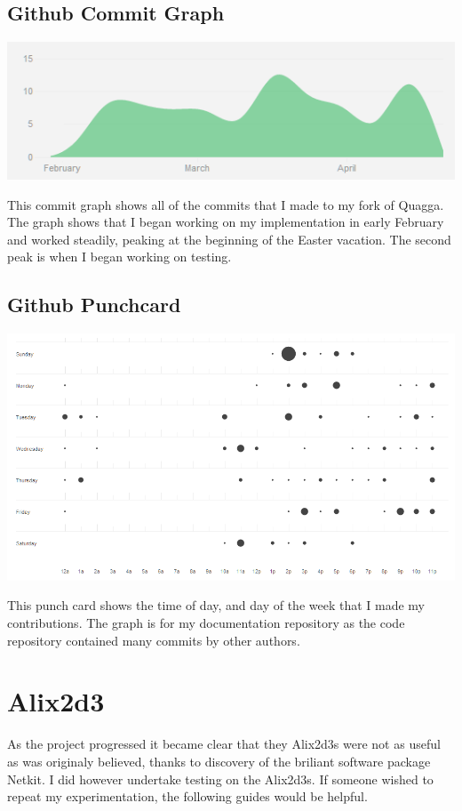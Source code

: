 \section{Github Commit Graph}
\begin{center}
	\includegraphics[width=\linewidth]{../Diagrams/Stats/GitHubCommitGraph.png}
\end{center}

This commit graph shows all of the commits that I made to my fork of Quagga.
The graph shows that I began working on my implementation in early February and
worked steadily, peaking at the beginning of the Easter vacation. The second
peak is when I began working on testing.

\section{Github Punchcard}
\begin{center}
	\includegraphics[width=\linewidth]{../Diagrams/Stats/GitHubPunchCard.png}
\end{center}

This punch card shows the time of day, and day of the week that I made 
my contributions. The graph is for my documentation repository as the code
repository contained many commits by other authors.

\chapter{Alix2d3}
As the project progressed it became clear that they Alix2d3s were not as useful
as was originaly believed, thanks to discovery of the briliant software package
Netkit. I did however undertake testing on the Alix2d3s. If someone wished to
repeat my experimentation, the following guides would be helpful. 

